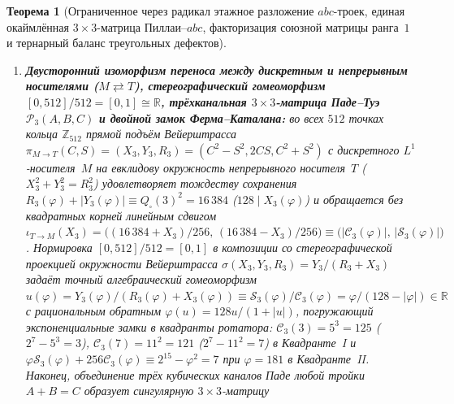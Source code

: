 \documentclass[11pt,a4paper]{article}
\theoremstyle{plain}
\newtheorem{theorem}{Теорема}[section]
\theoremstyle{definition}
\begin{document}
\begin{theorem}[Ограниченное через радикал этажное разложение $abc$-троек, единая окаймлённая $3\times 3$-матрица Пиллаи--$abc$, факторизация союзной матрицы ранга~$1$ и тернарный баланс треугольных дефектов]
\begin{enumerate}[label=\textbf{(\roman*)},leftmargin=*]
  \[
    u_a(u_b - u_c)(u_b u_c - 1) \;+\; u_b(u_c - u_a)(u_a u_c - 1) \;\equiv\; u_c(u_b - u_a)(u_a u_b - 1),
  \]
  в котором взаимная простота $\gcd(u_i u_j - 1,\,u_i u_j) = 1$ принудительно инжектирует в $\operatorname{rad}(A B C)$ новые простые делители, взаимно простые с $u_a u_b u_c$ (порождая $3^3 + 5 = 2^5$ при $(1,2,5)$ и $41 + 175 = 6^3$, т.е. $6^3 - 7\cdot 5^2 = 6\cdot 7 - 1 = 41$, при $(1,6,7)$). Наконец, при инволюции валов $(c_1\leftrightarrow c_2, a_1\leftrightarrow a_2)$ горизонтальный $3\times 3$-инвариант следа $\mathcal{I}_{\mathrm{horiz}} = (x^{a'}-x^a)^2 - (y^{b'}-y^b)^2$ и вертикальный $2\times 2$-инвариант конуса $\mathcal{I}_{\mathrm{vert}} = (x^a-y^b)^2 - (x^{a'}-y^{b'})^2$ связаны отношением $(\mathcal{I}_{\mathrm{vert}} - \mathcal{I}_{\mathrm{horiz}})/(\mathcal{I}_{\mathrm{vert}} + \mathcal{I}_{\mathrm{horiz}}) = (x^{a'}-y^b)/(x^a-y^{b'})$ и на Замке~III ($5^3 - 3^4 = 44 = 4\times 11$) дают двойное пифагорово тождество $(3^3-3^1)^2 + (11-4)^2 = 24^2 + 7^2 = 15^2 + 20^2 = k_{\mathrm{III}}^2 + (5^2-5^1)^2 = 25^2 = 625$.
\item \textbf{Двусторонний изоморфизм переноса между дискретным и непрерывным носителями ($M \rightleftarrows T$), стереографический гомеоморфизм $[0,512]/512 = [0,1] \cong \mathbb{R}$, трёхканальная $3\times 3$-матрица Паде--Туэ $\mathcal{P}_3(A,B,C)$ и двойной замок Ферма--Каталана:}
  во всех $512$ точках кольца $\mathbb{Z}_{512}$ прямой подъём Вейерштрасса $\pi_{M\to T}(C,S) = (X_3,Y_3,R_3) = (C^2-S^2,2CS,C^2+S^2)$ с дискретного $L^1$-носителя~$M$ на евклидову окружность непрерывного носителя~$T$ ($X_3^2+Y_3^2=R_3^2$) удовлетворяет тождеству сохранения $R_3(\varphi) + |Y_3(\varphi)| \equiv Q_\square(3)^2 = 16\,384$ ($128 \mid X_3(\varphi)$) и обращается без квадратных корней линейным сдвигом $\iota_{T\to M}(X_3) = \bigl((16\,384 + X_3)/256,\,(16\,384 - X_3)/256\bigr) \equiv \bigl(|\mathcal{C}_3(\varphi)|,\,|\mathcal{S}_3(\varphi)|\bigr)$. Нормировка $[0,512]/512 = [0,1]$ в композиции со стереографической проекцией окружности Вейерштрасса $\sigma(X_3,Y_3,R_3) = Y_3/(R_3+X_3)$ задаёт точный алгебраический гомеоморфизм $u(\varphi) = Y_3(\varphi)/(R_3(\varphi)+X_3(\varphi)) \equiv \mathcal{S}_3(\varphi)/\mathcal{C}_3(\varphi) = \varphi/(128-|\varphi|)\in\mathbb{R}$ с рациональным обратным $\varphi(u) = 128 u/(1+|u|)$, погружающий экспоненциальные замки в квадранты ротатора: $\mathcal{C}_3(3) = 5^3 = 125$ ($2^7-5^3=3$), $\mathcal{C}_3(7) = 11^2 = 121$ ($2^7-11^2=7$) в Квадранте~I и $\varphi\mathcal{S}_3(\varphi) + 256\mathcal{C}_3(\varphi) \equiv 2^{15}-\varphi^2 = 7$ при $\varphi = 181$ в Квадранте~II. Наконец, объединение трёх кубических каналов Паде любой тройки $A + B = C$ образует сингулярную $3\times 3$-матрицу

\end{enumerate}
\end{theorem}
\end{document}
